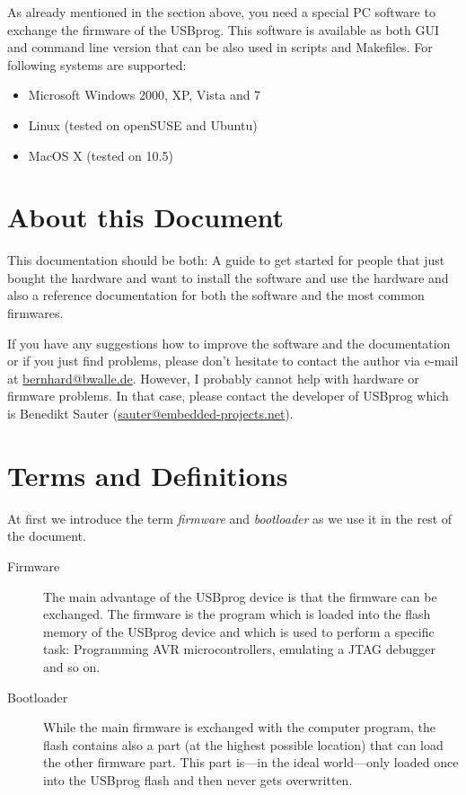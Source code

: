 \documentclass[bibtotoc,UKenglish,halfparskip,oneside,DIV12]{scrreprt}
\begin{document}
As already mentioned in the section above, you need a special PC software to exchange the firmware
of the USBprog. This software is available as both GUI and command line version that can be also
used in scripts and Makefiles. For following systems are supported:

\begin{itemize}
  \item Microsoft Windows 2000, XP, Vista and 7
  \item Linux (tested on openSUSE and Ubuntu)
  \item MacOS X (tested on 10.5)
\end{itemize}

\section{About this Document}

This documentation should be both: A guide to get started for people that just bought the hardware
and want to install the software and use the hardware and also a reference documentation for both
the software and the most common firmwares.

If you have any suggestions how to improve the software and the documentation or if you just find
problems, please don't hesitate to contact the author via e-mail at \url{bernhard@bwalle.de}.
However, I probably cannot help with hardware or firmware problems. In that case, please contact the
developer of USBprog which is Benedikt Sauter (\url{sauter@embedded-projects.net}).

\section{Terms and Definitions}

At first we introduce the term \emph{firmware} and \emph{bootloader} as we use it in the rest of the
document.

\begin{description}
  \item[Firmware] The main advantage of the USBprog device is that the firmware can be exchanged.
    The firmware is the program which is loaded into the flash memory of the USBprog device and
    which is used to perform a specific task: Programming AVR microcontrollers, emulating a JTAG
    debugger and so on.

  \item[Bootloader] While the main firmware is exchanged with the computer program, the flash
    contains also a part (at the highest possible location) that can load the other firmware part.
    This part is---in the ideal world---only loaded once into the USBprog flash and then never gets
    overwritten.
\end{description}
\end{document}
